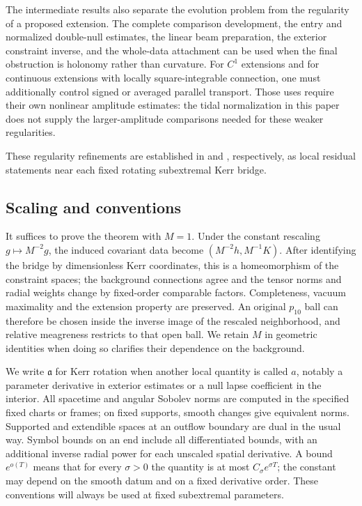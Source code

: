 The intermediate results also separate the evolution problem from
the regularity of a proposed extension. The complete comparison
development, the entry and normalized double-null estimates, the
linear beam preparation, the exterior constraint inverse, and the
whole-data attachment can be used when the final obstruction is
holonomy rather than curvature. For \(C^1\) extensions and for
continuous extensions with locally square-integrable connection,
one must additionally control signed or averaged parallel transport.
Those uses require their own nonlinear amplitude estimates: the
tidal normalization in this paper does not supply the larger-amplitude
comparisons needed for these weaker regularities.

These regularity refinements are established in
\cite[Theorem~2.3]{KerrCOne} and
\cite[Theorem~1.2]{KerrWeakConnection}, respectively, as local residual
statements near each fixed rotating subextremal Kerr bridge.

\subsection{Scaling and conventions}

It suffices to prove the theorem with \(M=1\). Under the constant
rescaling \(g\mapsto M^{-2}g\), the induced covariant data become
\((M^{-2}h,M^{-1}K)\). After identifying the bridge by dimensionless
Kerr coordinates, this is a homeomorphism of the constraint spaces;
the background connections agree and the tensor norms and radial
weights change by fixed-order comparable factors. Completeness,
vacuum maximality and the extension property are preserved. An
original \(p_{10}\) ball can therefore be chosen inside the inverse
image of the rescaled neighborhood, and relative meagreness restricts
to that open ball. We retain \(M\) in geometric identities when doing
so clarifies their dependence on the background.

We write \(\mathfrak a\) for Kerr rotation when another local quantity
is called \(a\), notably a parameter derivative in exterior estimates
or a null lapse coefficient in the interior. All spacetime and
angular Sobolev norms are computed in the specified fixed charts or
frames; on fixed supports, smooth changes give equivalent norms.
Supported and extendible spaces at an outflow boundary are dual in
the usual way. Symbol bounds on an end include all differentiated
bounds, with an additional inverse radial power for each unscaled
spatial derivative. A bound \(e^{o(T)}\) means that for every
\(\sigma>0\) the quantity is at most \(C_\sigma e^{\sigma T}\);
the constant may depend on the smooth datum and on a fixed derivative
order. These conventions will always be used at fixed subextremal
parameters.
